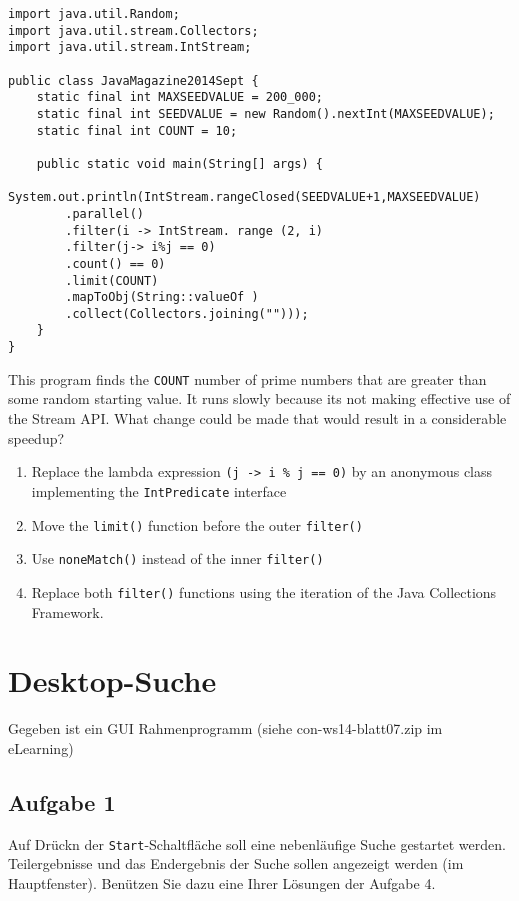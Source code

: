 \begin{verbatim}
import java.util.Random;
import java.util.stream.Collectors;
import java.util.stream.IntStream;

public class JavaMagazine2014Sept {
    static final int MAXSEEDVALUE = 200_000;
    static final int SEEDVALUE = new Random().nextInt(MAXSEEDVALUE);
    static final int COUNT = 10;

    public static void main(String[] args) {
        System.out.println(IntStream.rangeClosed(SEEDVALUE+1,MAXSEEDVALUE)
        .parallel()
        .filter(i -> IntStream. range (2, i)
        .filter(j-> i%j == 0)
        .count() == 0)
        .limit(COUNT)
        .mapToObj(String::valueOf )
        .collect(Collectors.joining("")));
    }
}
\end{verbatim}

This program finds the \texttt{COUNT} number of prime numbers that are
greater than some random starting value. It runs slowly because its not
making effective use of the Stream API. What change could be made that
would result in a considerable speedup?

\begin{enumerate}
\def\labelenumi{\arabic{enumi}.}
\tightlist
\item
  Replace the lambda expression
  \texttt{(j\ -\textgreater{}\ i\ \%\ j\ ==\ 0)} by an anonymous class
  implementing the \texttt{IntPredicate} interface
\item
  Move the \texttt{limit()} function before the outer \texttt{filter()}
\item
  Use \texttt{noneMatch()} instead of the inner \texttt{filter()}
\item
  Replace both \texttt{filter()} functions using the iteration of the
  Java Collections Framework.
\end{enumerate}

\section{Desktop-Suche}\label{desktop-suche}

Gegeben ist ein GUI Rahmenprogramm (siehe con-ws14-blatt07.zip im
eLearning)

\subsection{Aufgabe 1}\label{aufgabe-1-1}

Auf Drückn der \texttt{Start}-Schaltfläche soll eine nebenläufige Suche
gestartet werden. Teilergebnisse und das Endergebnis der Suche sollen
angezeigt werden (im Hauptfenster). Benützen Sie dazu eine Ihrer
Lösungen der Aufgabe 4.

